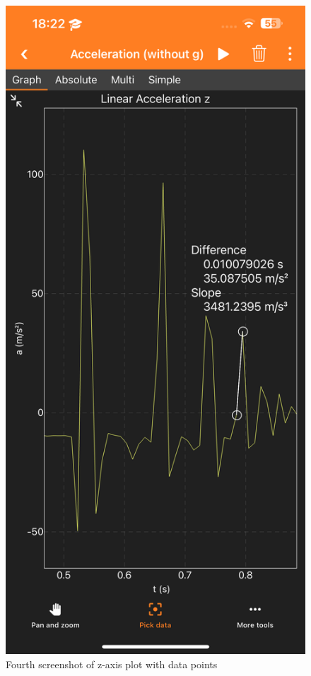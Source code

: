 \documentclass[idxtotoc,hyperref,openany]{labbook} %
\begin{document}
\begin{figure}[H] %
\begin{center}
\includegraphics[width=.7\linewidth]{images/Lab.02/PhoneDropZAnnotated4.PNG}
\end{center}
\caption{Fourth screenshot of z-axis plot with data points}
\label{fig:Lab02-PhoneDropZAnnotated4}
\end{figure}
\end{document}
